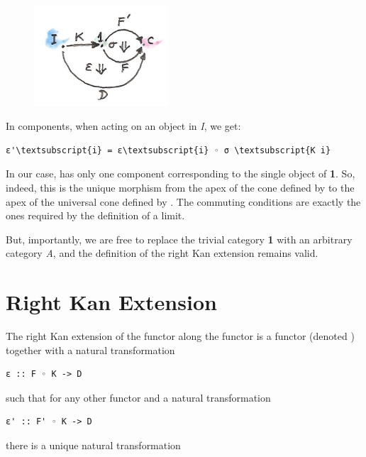 \begin{figure}[H]
\centering
\includegraphics[width=50mm]{images/kan5.jpg}
\end{figure}

\noindent
In components, when acting on an object  in \emph{I}, we get:

\begin{Verbatim}[commandchars=\\\{\}]
ε'\textsubscript{i} = ε\textsubscript{i} ◦ σ \textsubscript{K i}
\end{Verbatim}
In our case,  has only one component corresponding to the
single object of \textbf{1}. So, indeed, this is the unique morphism
from the apex of the cone defined by  to the apex of
the universal cone defined by . The commuting conditions
are exactly the ones required by the definition of a limit.

But, importantly, we are free to replace the trivial category \textbf{1}
with an arbitrary category \emph{A}, and the definition of the right Kan
extension remains valid.

\section{Right Kan Extension}\label{right-kan-extension}

The right Kan extension of the functor 
along the functor  is a functor
 (denoted ) together with a
natural transformation

\begin{Verbatim}[commandchars=\\\{\}]
ε :: F ◦ K -> D
\end{Verbatim}
such that for any other functor  and
a natural transformation

\begin{Verbatim}[commandchars=\\\{\}]
ε' :: F' ◦ K -> D
\end{Verbatim}
there is a unique natural transformation

